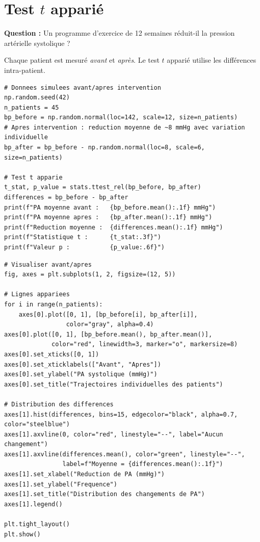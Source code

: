 \section{Test $t$ appari\'e}

\textbf{Question :} Un programme d'exercice de 12 semaines r\'eduit-il la pression art\'erielle systolique ?

Chaque patient est mesur\'e \emph{avant} et \emph{apr\`es}. Le test $t$ appari\'e utilise les diff\'erences intra-patient.

\begin{verbatim}
# Donnees simulees avant/apres intervention
np.random.seed(42)
n_patients = 45
bp_before = np.random.normal(loc=142, scale=12, size=n_patients)
# Apres intervention : reduction moyenne de ~8 mmHg avec variation individuelle
bp_after = bp_before - np.random.normal(loc=8, scale=6, size=n_patients)

# Test t apparie
t_stat, p_value = stats.ttest_rel(bp_before, bp_after)
differences = bp_before - bp_after
print(f"PA moyenne avant :   {bp_before.mean():.1f} mmHg")
print(f"PA moyenne apres :   {bp_after.mean():.1f} mmHg")
print(f"Reduction moyenne :  {differences.mean():.1f} mmHg")
print(f"Statistique t :      {t_stat:.3f}")
print(f"Valeur p :           {p_value:.6f}")
\end{verbatim}

\begin{verbatim}
# Visualiser avant/apres
fig, axes = plt.subplots(1, 2, figsize=(12, 5))

# Lignes appariees
for i in range(n_patients):
    axes[0].plot([0, 1], [bp_before[i], bp_after[i]],
                 color="gray", alpha=0.4)
axes[0].plot([0, 1], [bp_before.mean(), bp_after.mean()],
             color="red", linewidth=3, marker="o", markersize=8)
axes[0].set_xticks([0, 1])
axes[0].set_xticklabels(["Avant", "Apres"])
axes[0].set_ylabel("PA systolique (mmHg)")
axes[0].set_title("Trajectoires individuelles des patients")

# Distribution des differences
axes[1].hist(differences, bins=15, edgecolor="black", alpha=0.7, color="steelblue")
axes[1].axvline(0, color="red", linestyle="--", label="Aucun changement")
axes[1].axvline(differences.mean(), color="green", linestyle="--",
                label=f"Moyenne = {differences.mean():.1f}")
axes[1].set_xlabel("Reduction de PA (mmHg)")
axes[1].set_ylabel("Frequence")
axes[1].set_title("Distribution des changements de PA")
axes[1].legend()

plt.tight_layout()
plt.show()
\end{verbatim}

